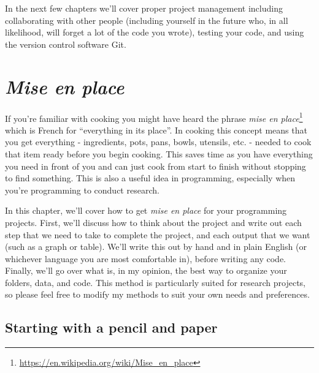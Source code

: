 \documentclass[
]{krantz}
\renewcommand{\href}[2]{#2\footnote{\url{#1}}}
\begin{document}
In the next few chapters we'll cover proper project management including collaborating with other people (including yourself in the future who, in all likelihood, will forget a lot of the code you wrote), testing your code, and using the version control software Git.

\hypertarget{mise-en-place}{%
\chapter{\texorpdfstring{\emph{Mise en place}}{Mise en place}}\label{mise-en-place}}

If you're familiar with cooking you might have heard the phrase \href{https://en.wikipedia.org/wiki/Mise_en_place}{\emph{mise en place}} which is French for ``everything in its place''. In cooking this concept means that you get everything - ingredients, pots, pans, bowls, utensils, etc. - needed to cook that item ready before you begin cooking. This saves time as you have everything you need in front of you and can just cook from start to finish without stopping to find something. This is also a useful idea in programming, especially when you're programming to conduct research.

In this chapter, we'll cover how to get \emph{mise en place} for your programming projects. First, we'll discuss how to think about the project and write out each step that we need to take to complete the project, and each output that we want (such as a graph or table). We'll write this out by hand and in plain English (or whichever language you are most comfortable in), before writing any code. Finally, we'll go over what is, in my opinion, the best way to organize your folders, data, and code. This method is particularly suited for research projects, so please feel free to modify my methods to suit your own needs and preferences.

\hypertarget{starting-with-a-pencil-and-paper}{%
\section{Starting with a pencil and paper}\label{starting-with-a-pencil-and-paper}}
\end{document}
